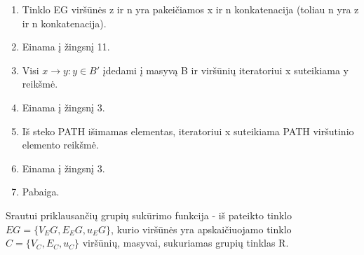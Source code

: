 \begin{enumerate}
	\item  Tinklo EG viršūnės z ir n yra pakeičiamos x ir n konkatenacija (toliau n yra z ir n konkatenacija).
	\item  Einama į žingsnį 11.
	\item  Visi $x \rightarrow y : y \in B'$ įdedami į masyvą B ir viršūnių iteratoriui x suteikiama y reikšmė.
	\item  Einama į žingsnį 3.
	\item  Iš steko PATH išimamas elementas, iteratoriui x suteikiama PATH viršutinio elemento reikšmė.
	\item  Einama į žingsnį 3.
	\item  Pabaiga.
\end{enumerate}

Srautui priklausančių grupių sukūrimo funkcija - iš pateikto tinklo $EG=\{V_EG, E_EG, u_EG\}$, kurio viršūnės yra apskaičiuojamo tinklo $C=\{V_C, E_C, u_C\}$ viršūnių, masyvai, sukuriamas grupių tinklas R.
